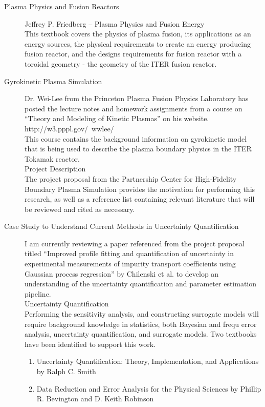 \documentclass{article}
\begin{document}
\begin{description}
\item[Plasma Physics and Fusion Reactors]
Jeffrey P. Friedberg – Plasma Physics and Fusion Energy\\
This textbook covers the physics of plasma fusion, its applications as an energy sources, the physical requirements to create an energy producing fusion reactor, and the designs requirements for fusion reactor with a toroidal geometry - the geometry of the ITER fusion reactor.\\
\item[Gyrokinetic Plasma Simulation]
Dr. Wei-Lee from the Princeton Plasma Fusion Physics Laboratory has posted the lecture notes and homework assignments from a course on “Theory and Modeling of Kinetic Plasmas” on his website.\\
http://w3.pppl.gov/~wwlee/\\
 This course contains the background information on gyrokinetic model that is being used to describe the plasma boundary physics in the ITER Tokamak reactor. \\
Project Description\\
The project proposal from the Partnership Center for High-Fidelity Boundary Plasma Simulation provides the motivation for performing this research, as well as a reference list containing relevant literature that will be reviewed and cited as necessary. \\

\item[Case Study to Understand Current Methods in Uncertainty Quantification]
I am currently reviewing a paper referenced from the project proposal titled “Improved profile fitting and quantification of uncertainty in experimental measurements of impurity transport coefficients using Gaussian process regression” by Chilenski et al. to develop an understanding of the uncertainty quantification and parameter estimation pipeline.\\
Uncertainty Quantification\\
Performing the sensitivity analysis, and constructing surrogate models will require background knowledge in statistics, both Bayesian and frequ error analysis, uncertainty quantification, and surrogate models. Two textbooks have been identified to support this work.\\
\begin{enumerate}
\item Uncertainty Quantification: Theory, Implementation, and Applications by Ralph C. Smith\\
\item Data Reduction and Error Analysis for the Physical Sciences by Phillip R. Bevington and D. Keith Robinson\\
\end{enumerate}
\end{description}

\newpage


\end{document}
